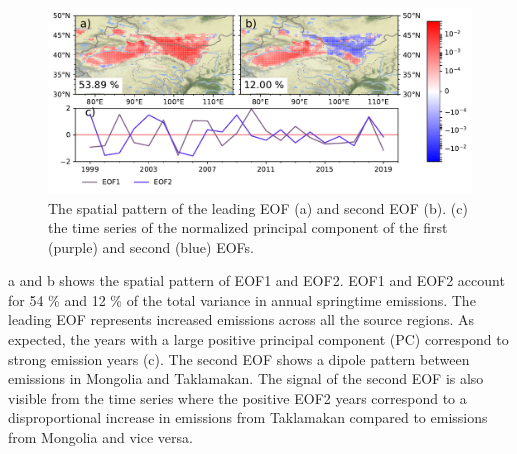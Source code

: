 \begin{figure}[htbp]
    \centering
    \includegraphics[width=\textwidth]{texfiles/figs/Emissions_EOF.pdf}
    \caption{The spatial pattern of the leading EOF (a) and second EOF (b). (c) the time series of the normalized principal component of the first (purple) and second (blue) EOFs.}
    \label{fig:emissions_eof}
\end{figure}
a and b shows the spatial pattern of EOF1 and EOF2. EOF1 and EOF2 account for 54 \% and 12 \% of the total variance in annual springtime emissions. 
The leading EOF represents increased emissions across all the source regions. 
As expected, the years with a large positive principal component (PC) correspond to strong emission years (c). 
The second EOF shows a dipole pattern between emissions in Mongolia and Taklamakan. 
The signal of the second EOF is also visible from the time series where the positive EOF2 years correspond to a disproportional increase in emissions from Taklamakan compared to emissions from Mongolia and vice versa.       

